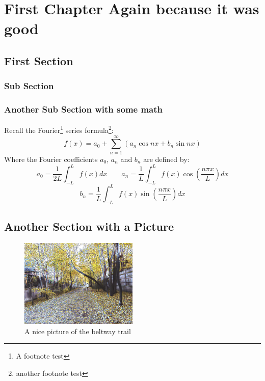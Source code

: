 \documentclass[10pt,letterpaper,twoside,final]{memoir}
\begin{document}
\lipsum[10-11]


\chapter{First Chapter Again because it was good}

\lipsum[11-14]

\section{First Section}

\lipsum[63]

\subsection{Sub Section}

\lipsum[41-45]

\subsection{Another Sub Section with some math}

\lipsum[16-17]
Recall the Fourier\footnote{A footnote test} series formula\footnote{another footnote test \lipsum[1]}:
\[
f(x) = a_0 + \sum_{n = 1}^\infty \left( a_n \cos nx + b_n \sin nx \right)
\]
Where the Fourier coefficients $a_0$, $a_n$ and $b_n$ are defined by:
\[
a_0 = \frac{1}{2L} \int_{-L}^L f(x) dx  \qquad
a_n = \frac{1}{L}  \int_{-L}^L f(x) \cos \left( \frac{n\pi x}{L} \right) dx 
\]
\[
b_n = \frac{1}{L}  \int_{-L}^L f(x) \sin \left( \frac{n\pi x}{L} \right) dx 
\]
\lipsum[88]

\section{Another Section with a Picture}

\lipsum[89-93]
\begin{figure}
\centering
\includegraphics[width=0.5\textwidth]{TrailPic1}
\caption{\label{fig:path}A nice picture of the beltway trail}
\end{figure}
\end{document}
